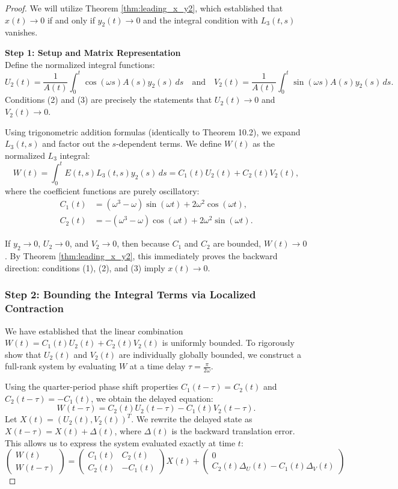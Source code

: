 \documentclass[10pt,reqno]{amsart}
\theoremstyle{definition}
\begin{document}
	\begin{proof}
		We will utilize Theorem \ref{thm:leading_x_y2}, which established that $x(t) \to 0$ if and only if $y_2(t) \to 0$ and the integral condition with $L_3(t, s)$ vanishes.
		
		\textbf{Step 1: Setup and Matrix Representation}\\
		Define the normalized integral functions:
		\[ U_2(t) = \frac{1}{A(t)} \int_0^t \cos(\omega s) A(s) y_2(s) \, ds \quad \text{and} \quad V_2(t) = \frac{1}{A(t)} \int_0^t \sin(\omega s) A(s) y_2(s) \, ds. \]
		Conditions (2) and (3) are precisely the statements that $U_2(t) \to 0$ and $V_2(t) \to 0$.
		
		Using trigonometric addition formulas (identically to Theorem 10.2), we expand $L_3(t, s)$ and factor out the $s$-dependent terms. We define $W(t)$ as the normalized $L_3$ integral:
		\[ W(t) = \int_0^t E(t, s) L_3(t, s) y_2(s) \, ds = C_1(t) U_2(t) + C_2(t) V_2(t), \]
		where the coefficient functions are purely oscillatory:
		\begin{align*}
			C_1(t) &= (\omega^3 - \omega)\sin(\omega t) + 2\omega^2\cos(\omega t), \\
			C_2(t) &= -(\omega^3 - \omega)\cos(\omega t) + 2\omega^2\sin(\omega t).
		\end{align*}
		
		If $y_2 \to 0$, $U_2 \to 0$, and $V_2 \to 0$, then because $C_1$ and $C_2$ are bounded, $W(t) \to 0$. By Theorem \ref{thm:leading_x_y2}, this immediately proves the backward direction: conditions (1), (2), and (3) imply $x(t) \to 0$.
				
		\subsubsection*{Step 2: Bounding the Integral Terms via Localized Contraction}
		
		We have established that the linear combination $W(t)=C_1(t)U_2(t)+C_2(t)V_2(t)$ is uniformly bounded. To rigorously show that $U_2(t)$ and $V_2(t)$ are individually globally bounded, we construct a full-rank system by evaluating $W$ at a time delay $\tau=\frac{\pi}{2\omega}$.
		
		Using the quarter-period phase shift properties $C_1(t-\tau)=C_2(t)$ and $C_2(t-\tau)=-C_1(t)$, we obtain the delayed equation:
		$$W(t-\tau)=C_2(t)U_2(t-\tau)-C_1(t)V_2(t-\tau).$$
		Let $X(t)=(U_2(t),V_2(t))^T$. We rewrite the delayed state as $X(t-\tau)=X(t)+\Delta(t)$, where $\Delta(t)$ is the backward translation error. This allows us to express the system evaluated exactly at time $t$:
		$$\begin{pmatrix} W(t) \\ W(t-\tau) \end{pmatrix}=\begin{pmatrix} C_1(t) & C_2(t) \\ C_2(t) & -C_1(t) \end{pmatrix}X(t)+\begin{pmatrix} 0 \\ C_2(t)\Delta_U(t)-C_1(t)\Delta_V(t) \end{pmatrix}$$
		

\end{proof}
\end{document}
